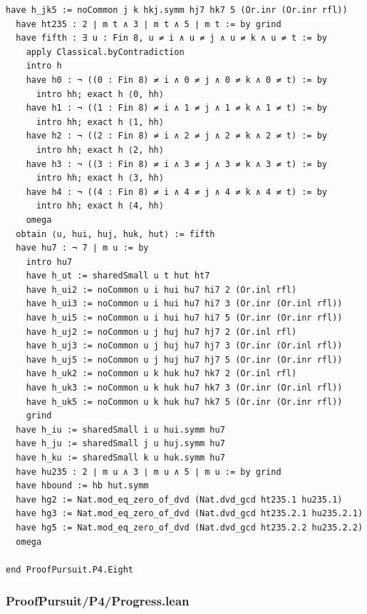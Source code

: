 \documentclass[11pt,a4paper]{article}
\begin{document}
\begin{Verbatim}[breaklines,breakanywhere,fontsize=\footnotesize]
  have h_jk5 := noCommon j k hkj.symm hj7 hk7 5 (Or.inr (Or.inr rfl))
  have ht235 : 2 ∣ m t ∧ 3 ∣ m t ∧ 5 ∣ m t := by grind
  have fifth : ∃ u : Fin 8, u ≠ i ∧ u ≠ j ∧ u ≠ k ∧ u ≠ t := by
    apply Classical.byContradiction
    intro h
    have h0 : ¬ ((0 : Fin 8) ≠ i ∧ 0 ≠ j ∧ 0 ≠ k ∧ 0 ≠ t) := by
      intro hh; exact h ⟨0, hh⟩
    have h1 : ¬ ((1 : Fin 8) ≠ i ∧ 1 ≠ j ∧ 1 ≠ k ∧ 1 ≠ t) := by
      intro hh; exact h ⟨1, hh⟩
    have h2 : ¬ ((2 : Fin 8) ≠ i ∧ 2 ≠ j ∧ 2 ≠ k ∧ 2 ≠ t) := by
      intro hh; exact h ⟨2, hh⟩
    have h3 : ¬ ((3 : Fin 8) ≠ i ∧ 3 ≠ j ∧ 3 ≠ k ∧ 3 ≠ t) := by
      intro hh; exact h ⟨3, hh⟩
    have h4 : ¬ ((4 : Fin 8) ≠ i ∧ 4 ≠ j ∧ 4 ≠ k ∧ 4 ≠ t) := by
      intro hh; exact h ⟨4, hh⟩
    omega
  obtain ⟨u, hui, huj, huk, hut⟩ := fifth
  have hu7 : ¬ 7 ∣ m u := by
    intro hu7
    have h_ut := sharedSmall u t hut ht7
    have h_ui2 := noCommon u i hui hu7 hi7 2 (Or.inl rfl)
    have h_ui3 := noCommon u i hui hu7 hi7 3 (Or.inr (Or.inl rfl))
    have h_ui5 := noCommon u i hui hu7 hi7 5 (Or.inr (Or.inr rfl))
    have h_uj2 := noCommon u j huj hu7 hj7 2 (Or.inl rfl)
    have h_uj3 := noCommon u j huj hu7 hj7 3 (Or.inr (Or.inl rfl))
    have h_uj5 := noCommon u j huj hu7 hj7 5 (Or.inr (Or.inr rfl))
    have h_uk2 := noCommon u k huk hu7 hk7 2 (Or.inl rfl)
    have h_uk3 := noCommon u k huk hu7 hk7 3 (Or.inr (Or.inl rfl))
    have h_uk5 := noCommon u k huk hu7 hk7 5 (Or.inr (Or.inr rfl))
    grind
  have h_iu := sharedSmall i u hui.symm hu7
  have h_ju := sharedSmall j u huj.symm hu7
  have h_ku := sharedSmall k u huk.symm hu7
  have hu235 : 2 ∣ m u ∧ 3 ∣ m u ∧ 5 ∣ m u := by grind
  have hbound := hb hut.symm
  have hg2 := Nat.mod_eq_zero_of_dvd (Nat.dvd_gcd ht235.1 hu235.1)
  have hg3 := Nat.mod_eq_zero_of_dvd (Nat.dvd_gcd ht235.2.1 hu235.2.1)
  have hg5 := Nat.mod_eq_zero_of_dvd (Nat.dvd_gcd ht235.2.2 hu235.2.2)
  omega

end ProofPursuit.P4.Eight
\end{Verbatim}

\subsubsection{ProofPursuit/P4/Progress.lean}\label{proofpursuitp4progress.lean}
\end{document}
